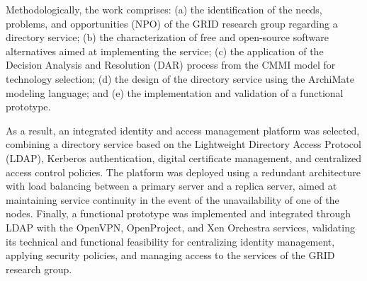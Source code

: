 Methodologically, the work comprises: (a) the identification of the needs, problems, and opportunities (NPO) of the GRID research group regarding a directory service; (b) the characterization of free and open-source software alternatives aimed at implementing the service; (c) the application of the Decision Analysis and Resolution (DAR) process from the CMMI model for technology selection; (d) the design of the directory service using the ArchiMate modeling language; and (e) the implementation and validation of a functional prototype.

As a result, an integrated identity and access management platform was selected, combining a directory service based on the Lightweight Directory Access Protocol (LDAP), Kerberos authentication, digital certificate management, and centralized access control policies. The platform was deployed using a redundant architecture with load balancing between a primary server and a replica server, aimed at maintaining service continuity in the event of the unavailability of one of the nodes. Finally, a functional prototype was implemented and integrated through LDAP with the OpenVPN, OpenProject, and Xen Orchestra services, validating its technical and functional feasibility for centralizing identity management, applying security policies, and managing access to the services of the GRID research group.
